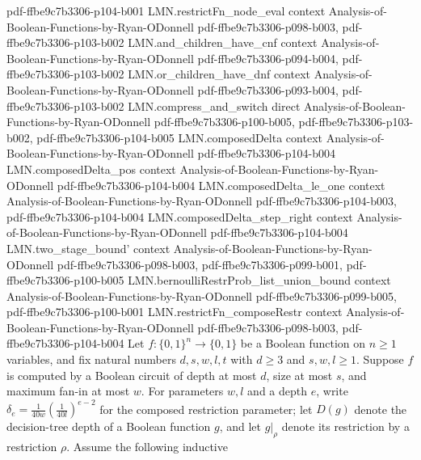 \begin{lemma}
  {pdf-ffbe9c7b3306-p104-b001}
\proofstep
  {LMN.restrictFn_node_eval}
  {context}
  {Analysis-of-Boolean-Functions-by-Ryan-ODonnell}
  {pdf-ffbe9c7b3306-p098-b003,
    pdf-ffbe9c7b3306-p103-b002}
\proofstep
  {LMN.and_children_have_cnf}
  {context}
  {Analysis-of-Boolean-Functions-by-Ryan-ODonnell}
  {pdf-ffbe9c7b3306-p094-b004,
    pdf-ffbe9c7b3306-p103-b002}
\proofstep
  {LMN.or_children_have_dnf}
  {context}
  {Analysis-of-Boolean-Functions-by-Ryan-ODonnell}
  {pdf-ffbe9c7b3306-p093-b004,
    pdf-ffbe9c7b3306-p103-b002}
\proofstep
  {LMN.compress_and_switch}
  {direct}
  {Analysis-of-Boolean-Functions-by-Ryan-ODonnell}
  {pdf-ffbe9c7b3306-p100-b005,
    pdf-ffbe9c7b3306-p103-b002,
    pdf-ffbe9c7b3306-p104-b005}
\proofstep
  {LMN.composedDelta}
  {context}
  {Analysis-of-Boolean-Functions-by-Ryan-ODonnell}
  {pdf-ffbe9c7b3306-p104-b004}
\proofstep
  {LMN.composedDelta_pos}
  {context}
  {Analysis-of-Boolean-Functions-by-Ryan-ODonnell}
  {pdf-ffbe9c7b3306-p104-b004}
\proofstep
  {LMN.composedDelta_le_one}
  {context}
  {Analysis-of-Boolean-Functions-by-Ryan-ODonnell}
  {pdf-ffbe9c7b3306-p104-b003,
    pdf-ffbe9c7b3306-p104-b004}
\proofstep
  {LMN.composedDelta_step_right}
  {context}
  {Analysis-of-Boolean-Functions-by-Ryan-ODonnell}
  {pdf-ffbe9c7b3306-p104-b004}
\proofstep
  {LMN.two_stage_bound'}
  {context}
  {Analysis-of-Boolean-Functions-by-Ryan-ODonnell}
  {pdf-ffbe9c7b3306-p098-b003,
    pdf-ffbe9c7b3306-p099-b001,
    pdf-ffbe9c7b3306-p100-b005}
\proofstep
  {LMN.bernoulliRestrProb_list_union_bound}
  {context}
  {Analysis-of-Boolean-Functions-by-Ryan-ODonnell}
  {pdf-ffbe9c7b3306-p099-b005,
    pdf-ffbe9c7b3306-p100-b001}
\proofstep
  {LMN.restrictFn_composeRestr}
  {context}
  {Analysis-of-Boolean-Functions-by-Ryan-ODonnell}
  {pdf-ffbe9c7b3306-p098-b003,
    pdf-ffbe9c7b3306-p104-b004}
Let $f:\{0,1\}^n \to \{0,1\}$ be a Boolean function on $n \ge 1$ variables, and fix
natural numbers $d,s,w,l,t$ with $d \ge 3$ and $s,w,l \ge 1$. Suppose $f$ is computed by
a Boolean circuit of depth at most $d$, size at most $s$, and maximum fan-in at most
$w$. For parameters $w,l$ and a depth $e$, write $\delta_e =
\frac{1}{40w}\left(\frac{1}{40l}\right)^{e-2}$ for the composed restriction parameter;
let $D(g)$ denote the decision-tree depth of a Boolean function $g$, and let $g|_\rho$
denote its restriction by a restriction $\rho$. Assume the following inductive

\end{lemma}
